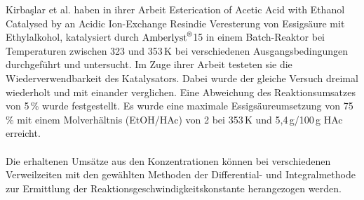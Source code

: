 \documentclass[12pt,liststotoc]{report}
\begin{document}
Kirba{\c{s}}lar et al. \cite{kirbacslar2001esterification} haben in ihrer Arbeit \glqq Esterication of Acetic Acid with Ethanol Catalysed by an Acidic Ion-Exchange Resin\grqq\;die Veresterung von Essigsäure mit Ethylalkohol, katalysiert durch $\text{Amberlyst}^\text{\textregistered}$15 in einem Batch-Reaktor bei Temperaturen zwischen 323 und 353\,K bei verschiedenen Ausgangsbedingungen durchgeführt und untersucht. Im Zuge ihrer Arbeit testeten sie die Wiederverwendbarkeit des Katalysators. Dabei wurde der gleiche Versuch dreimal wiederholt und mit einander verglichen. Eine Abweichung des Reaktionsumsatzes von 5\,\% wurde festgestellt. Es wurde eine maximale Essigsäureumsetzung von 75\,\% mit einem Molverhältnis (EtOH/HAc) von 2 bei 353\,K und 5,4\,g/100\,g HAc erreicht.
\\
\\
Die erhaltenen Umsätze aus den Konzentrationen können bei verschiedenen Verweilzeiten mit den gewählten Methoden der Differential- und Integralmethode zur Ermittlung der Reaktionsgeschwindigkeitskonstante herangezogen werden.
\\
\\
%
\end{document}
